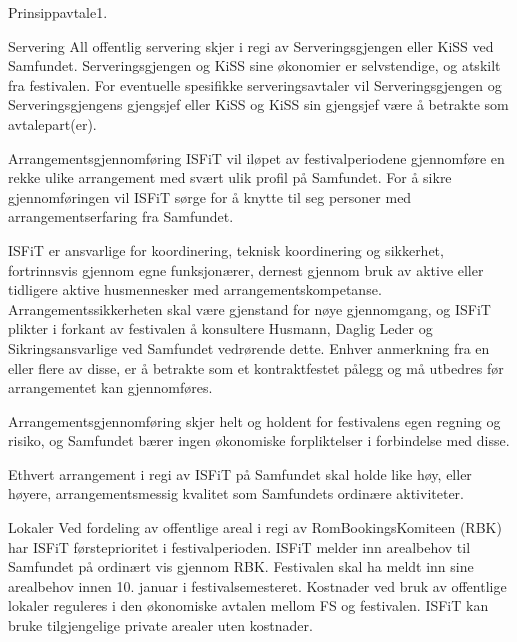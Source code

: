 \begin{instruks}{Prinsippavtale}{1. }{ }
    \begin{instruksledd}{Servering}
        All offentlig servering skjer i regi av Serveringsgjengen eller KiSS ved Samfundet.
        Serveringsgjengen og KiSS sine økonomier er selvstendige, og atskilt fra festivalen. For eventuelle
        spesifikke serveringsavtaler vil Serveringsgjengen og Serveringsgjengens gjengsjef eller KiSS og
        KiSS sin gjengsjef være å betrakte som avtalepart(er).
    \end{instruksledd}

    \begin{instruksledd}{Arrangementsgjennomføring}
        ISFiT vil iløpet av festivalperiodene gjennomføre en rekke ulike arrangement med
        svært ulik profil på Samfundet. For å sikre gjennomføringen vil ISFiT sørge for å knytte til seg
        personer med arrangementserfaring fra Samfundet. 

        ISFiT er ansvarlige for koordinering, teknisk koordinering og sikkerhet, fortrinnsvis gjennom egne
        funksjonærer, dernest gjennom bruk av aktive eller tidligere aktive husmennesker med
        arrangementskompetanse.
        Arrangementssikkerheten skal være gjenstand for nøye gjennomgang, og ISFiT plikter i forkant av
        festivalen å
        konsultere Husmann, Daglig Leder og Sikringsansvarlige ved Samfundet vedrørende dette. Enhver
        anmerkning fra en
        eller flere av disse, er å betrakte som et kontraktfestet pålegg og må utbedres før arrangementet
        kan gjennomføres.

        Arrangementsgjennomføring skjer helt og holdent for festivalens egen regning og risiko, og Samfundet
        bærer ingen
        økonomiske forpliktelser i forbindelse med disse.

        Ethvert arrangement i regi av ISFiT på Samfundet skal holde like høy, eller høyere,
        arrangementsmessig kvalitet som
        Samfundets ordinære aktiviteter.
    \end{instruksledd}

    \begin{instruksledd}{Lokaler}
        Ved fordeling av offentlige areal i regi av RomBookingsKomiteen (RBK) har ISFiT førsteprioritet i
        festivalperioden.
        ISFiT melder inn arealbehov til Samfundet på ordinært vis gjennom RBK. Festivalen skal ha meldt inn
        sine arealbehov innen 10. januar i festivalsemesteret. Kostnader ved bruk av offentlige lokaler
        reguleres i den økonomiske
        avtalen mellom FS og festivalen. ISFiT kan bruke tilgjengelige private arealer uten kostnader.
    \end{instruksledd}


\end{instruks}
